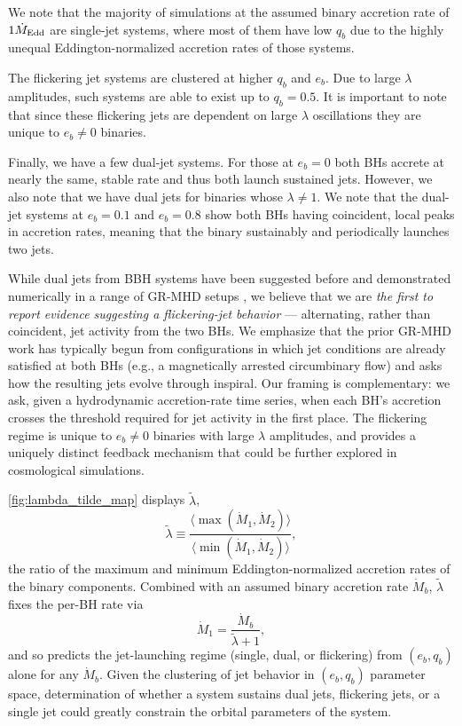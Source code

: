 \documentclass[fleqn,usenatbib]{mnras}
\begin{document}
We note that the majority of simulations at the assumed binary accretion rate of $1\dot{M}_{\rm Edd}$ are single-jet systems, where most of them have low $q_b$ due to the highly unequal Eddington-normalized accretion rates of those systems. 

The flickering jet systems are clustered at higher $q_b$ and $e_b$. Due to large $\lambda$ amplitudes, such systems are able to exist up to $q_b=0.5$. It is important to note that since these flickering jets are dependent on large $\lambda$ oscillations they are unique to $e_b \neq 0$ binaries.

Finally, we have a few dual-jet systems. For those at $e_b=0$ both BHs accrete at nearly the same, stable rate and thus both launch sustained jets. However, we also note that we have dual jets for binaries whose $\lambda \neq 1$. We note that the dual-jet systems at $e_b=0.1$ and $e_b=0.8$ show both BHs having coincident, local peaks in accretion rates, meaning that the binary sustainably and periodically launches two jets.

While dual jets from BBH systems have been suggested before \citep{Palenzuela_dualjet_10, Qian_dualjet_19} and demonstrated numerically in a range of GR-MHD setups \citep{Gutierrez_24, Ressler_dualjet_25, Ruiz_Shapiro_23, Most_Wang_24, Ennoggi_25}, we believe that we are \textit{the first to report evidence suggesting a flickering-jet behavior} --- alternating, rather than coincident, jet activity from the two BHs. We emphasize that the prior GR-MHD work has typically begun from configurations in which jet conditions are already satisfied at both BHs (e.g., a magnetically arrested circumbinary flow) and asks how the resulting jets evolve through inspiral. Our framing is complementary: we ask, given a hydrodynamic accretion-rate time series, when each BH's accretion crosses the threshold required for jet activity in the first place. The flickering regime is unique to $e_b \neq 0$ binaries with large $\lambda$ amplitudes, and provides a uniquely distinct feedback mechanism that could be further explored in cosmological simulations. 

\autoref{fig:lambda_tilde_map} displays $\tilde{\lambda}$,
\begin{equation}
    \tilde{\lambda} \equiv \frac{\langle \max (\dot{M}_{1}, \dot{M}_{2}) \rangle }{\langle \min (\dot{M}_{1}, \dot{M}_{2}) \rangle},
\end{equation}
the ratio of the maximum and minimum Eddington-normalized accretion rates of the binary components. Combined with an assumed binary accretion rate $\dot{M}_b$, $\tilde{\lambda}$ fixes the per-BH rate via
\begin{equation}
    \dot{M}_1 = \frac{\dot{M}_b}{\tilde{\lambda} + 1},
\end{equation}
and so predicts the jet-launching regime (single, dual, or flickering) from $(e_b, q_b)$ alone for any $\dot{M}_b$. Given the clustering of jet behavior in $(e_b, q_b)$ parameter space, determination of whether a system sustains dual jets, flickering jets, or a single jet could greatly constrain the orbital parameters of the system.
\end{document}
